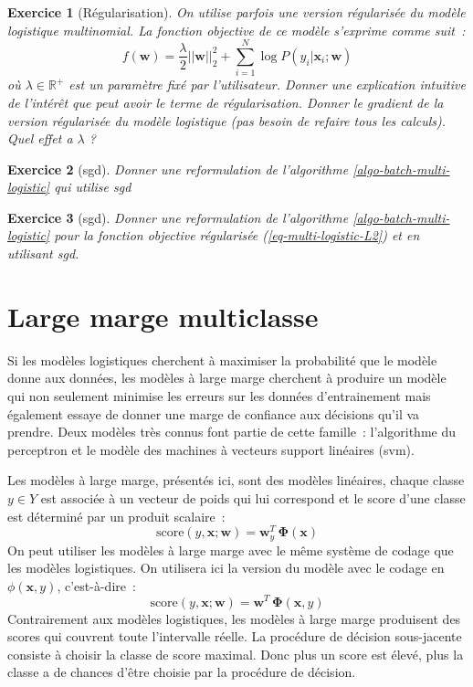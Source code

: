 \documentclass[11pt,openany]{book}
\newtheorem{exo}{Exercice}[chapter]
\newcommand{\ac}[1]{{\sc #1}} %
\begin{document}
\begin{exo}[Régularisation]
On utilise parfois une version régularisée du modèle logistique
multinomial. La fonction objective de ce modèle s'exprime comme suit~:
\begin{equation}
\label{eq-multi-logistic-L2}
f(\mathbf{w}) =  \frac{\lambda}{2}||\mathbf{w}||_2^2+ \sum_{i=1}^N
\log P(y_i|\mathbf{x}_i;\mathbf{w})
\end{equation}
où $\lambda \in \mathbb{R}^+$ est un paramètre fixé par l'utilisateur.  
Donner une explication intuitive de l'intérêt que peut avoir le terme
de régularisation. 
Donner le gradient de la version régularisée du modèle logistique (pas
besoin de refaire tous les calculs). Quel effet a $\lambda$ ? 
\end{exo}
\begin{exo}[\ac{sgd}]
Donner une reformulation de l'algorithme
\ref{algo-batch-multi-logistic} qui utilise \ac{sgd}
\end{exo}
\begin{exo}[\ac{sgd}]
Donner une reformulation de l'algorithme
\ref{algo-batch-multi-logistic} pour la fonction
objective régularisée (\ref{eq-multi-logistic-L2}) et en utilisant \ac{sgd}.
\end{exo}

\section{Large marge multiclasse}

Si les modèles logistiques cherchent à maximiser la probabilité que le
modèle donne aux données, les modèles à large marge cherchent à
produire un modèle qui non seulement minimise les erreurs sur les
données d'entrainement mais également essaye de donner une marge de
confiance aux décisions qu'il va prendre. Deux modèles très connus
font partie de cette famille~: l'algorithme du perceptron et le modèle
des machines à vecteurs support linéaires (\ac{svm}).

Les modèles à large marge, présentés ici, sont des modèles linéaires, chaque classe
$y\in Y$ est associée à un vecteur de poids qui lui correspond et le
score d'une classe est déterminé par un produit scalaire~:
\begin{equation}
\text{score}(y,\mathbf{x};\mathbf{w}) =  \mathbf{w}_y^T \,
    \boldsymbol\Phi(\mathbf{x})
\end{equation}
On peut utiliser les modèles à large marge avec le même système de
codage que les modèles logistiques. On utilisera ici la version du modèle avec le 
codage en $\phi(\mathbf{x},y)$, c'est-à-dire~:
\begin{equation}
\text{score}(y,\mathbf{x};\mathbf{w}) =  \mathbf{w}^T \,
    \boldsymbol\Phi(\mathbf{x},y)
\end{equation}
Contrairement aux modèles logistiques, les modèles à large marge
produisent des scores qui couvrent toute l'intervalle réelle. La
procédure de décision sous-jacente consiste à choisir la classe de
score maximal. Donc plus un score est élevé, plus la classe a de
chances d'être choisie par la procédure de décision.
\end{document}
